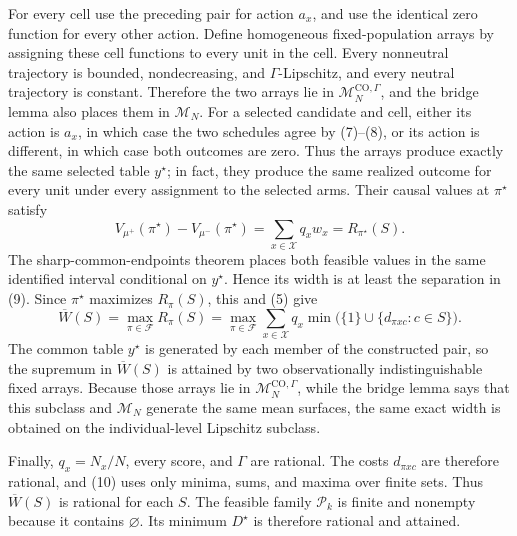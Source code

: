 For every cell use the preceding pair for action \(a_x\), and use the
identical zero function for every other action.  Define homogeneous
fixed-population arrays by assigning these cell functions to every unit in
the cell.  Every nonneutral trajectory is bounded, nondecreasing, and
\(\Gamma\)-Lipschitz, and every neutral trajectory is constant.  Therefore
the two arrays lie in \(\mathcal M_N^{\mathrm{CO},\Gamma}\), and the bridge
lemma also places them in \(\mathcal M_N\).  For a selected candidate and
cell, either its action is \(a_x\), in which case the two schedules agree by
(7)--(8), or its action is different, in which case both outcomes are zero.
Thus the arrays produce exactly the same selected table \(y^\star\); in
fact, they produce the same realized outcome for every unit under every
assignment to the selected arms.  Their causal values at \(\pi^\star\)
satisfy
\[
V_{\mu^+}(\pi^\star)-V_{\mu^-}(\pi^\star)
=\sum_{x\in\mathcal X}q_xw_x
=R_{\pi^\star}(S).                                                   \tag{9}
\]
The sharp-common-endpoints theorem places both feasible values in the same
identified interval conditional on \(y^\star\).  Hence its width is at least
the separation in (9).  Since \(\pi^\star\) maximizes \(R_\pi(S)\), this
and (5) give
\[
\overline W(S)
=\max_{\pi\in\mathcal F}R_\pi(S)
=\max_{\pi\in\mathcal F}\sum_{x\in\mathcal X}q_x
\min\bigl(\{1\}\cup\{d_{\pi xc}:c\in S\}\bigr).                \tag{10}
\]
The common table \(y^\star\) is generated by each member of the constructed
pair, so the supremum in \(\overline W(S)\) is attained by two
observationally indistinguishable fixed arrays.  Because those arrays lie in
\(\mathcal M_N^{\mathrm{CO},\Gamma}\), while the bridge lemma says that
this subclass and \(\mathcal M_N\) generate the same mean surfaces, the
same exact width is obtained on the individual-level Lipschitz subclass.

Finally, \(q_x=N_x/N\), every score, and \(\Gamma\) are rational.  The
costs \(d_{\pi xc}\) are therefore rational, and (10) uses only minima,
sums, and maxima over finite sets.  Thus \(\overline W(S)\) is rational for
each \(S\).  The feasible family \(\mathcal P_k\) is finite and nonempty
because it contains \(\varnothing\).  Its minimum \(D^\star\) is therefore
rational and attained.

